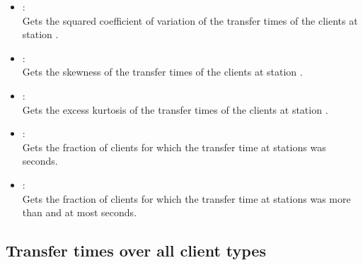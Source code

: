 \begin{itemize}
\item
{}:\\
Gets the squared coefficient of variation of the transfer times of the clients at station .

\item
{}:\\
Gets the skewness of the transfer times of the clients at station .

\item
{}:\\
Gets the excess kurtosis of the transfer times of the clients at station .

\item
{}:\\
Gets the fraction of clients for which the transfer time at stations  was  seconds.

\item
{}:\\
Gets the fraction of clients for which the transfer time at stations  was more than  and at most  seconds.

\end{itemize}  



\subsection{Transfer times over all client types}

